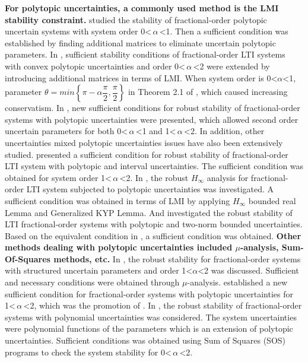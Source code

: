 \documentclass[]{interact}
\theoremstyle{plain}%
\theoremstyle{definition}
\theoremstyle{remark}
\begin{document}
\par \textbf{For polytopic uncertainties, a commonly used method is the LMI stability constraint.} \cite{Far2011} studied the stability of fractional-order polytopic uncertain systems with system order 0\textless\,$\alpha$\,\textless1. Then a sufficient condition was established by finding additional matrices to eliminate uncertain polytopic parameters. In \cite{Lu2013a}, sufficient stability conditions of fractional-order LTI systems with convex polytopic uncertainties and order 0\textless\,$\alpha$\,\textless2 were extended by introducing additional matrices in terms of LMI. When system order is 0\textless$\alpha$\textless1, parameter $\theta = min\left\lbrace \pi-\alpha\dfrac{\pi}{2}, \dfrac{\pi}{2}\right\rbrace$ in Theorem 2.1 of \cite{Lu2013a}, which caused increasing conservatism. In \cite{Chen2015}, new sufficient conditions for robust stability of fractional-order systems with polytopic uncertainties were presented, which allowed second order uncertain parameters for both 0\textless\,$\alpha$\,\textless1 and 1\textless\,$\alpha$\,\textless2. In addition, other uncertainties mixed polytopic uncertainties issues have also been extensively studied. \cite{Abo2017} presented a sufficient condition for robust stability of fractional-order LTI system with polytopic and interval uncertainties. The sufficient condition was obtained for system order 1\textless\,$\alpha$\,\textless2. In \cite{Xie2017}, the robust $H_\infty$ analysis for fractional-order LTI system subjected to polytopic uncertainties was investigated. A sufficient condition was obtained in terms of LMI by applying $H_\infty$ bounded real Lemma and Generalized KYP Lemma. And \cite{Li2018} investigated the robust stability of LTI fractional-order systems with polytopic and two-norm bounded uncertainties. Based on the equivalent condition in \cite{Far2010}, a sufficient condition was obtained. \textbf{Other methods dealing with polytopic uncertainties included $\mu$-analysis, Sum-Of-Squares methods, etc.} In \cite{Lu2013b}, the robust stability for fractional-order systems with structured uncertain parameters and order 1\textless$\alpha$\textless2 was discussed. Sufficient and necessary conditions were obtained through $\mu$-analysis. \cite{Yang2018} established a new sufficient condition for fractional-order systems with polytopic uncertainties for 1\textless\,$\alpha$\,\textless2, which was the promotion of \cite{Lu2013b}. In \cite{Zheng2020}, the robust stability of fractional-order systems with polynomial uncertainties was considered. The system uncertainties were polynomial functions of the parameters which is an extension of polytopic uncertainties. Sufficient conditions was obtained using Sum of Squares (SOS) programs to check the system stability for 0\textless\,$\alpha$\,\textless2.
\end{document}
